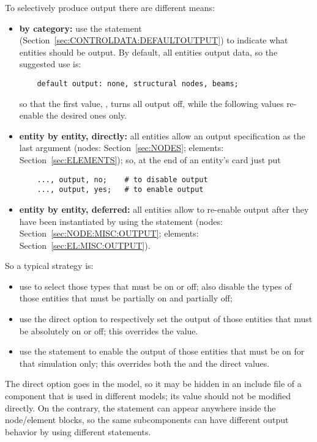 To selectively produce output there are different means:
\begin{itemize}
\item \textbf{by category:} use the  statement
(Section~\ref{sec:CONTROLDATA:DEFAULTOUTPUT}) to indicate what entities
should be output.
By default, all entities output data, so the suggested use is:
\begin{verbatim}
    default output: none, structural nodes, beams;
\end{verbatim}
so that the first value, , turns all output off, while the
following values re-enable the desired ones only.

\item \textbf{entity by entity, directly:}
all entities allow an output specification as the last argument
(nodes: Section~\ref{sec:NODES}; elements: Section~\ref{sec:ELEMENTS});
so, at the end of an entity's card just put
\begin{verbatim}
    ..., output, no;    # to disable output
    ..., output, yes;   # to enable output
\end{verbatim}

\item \textbf{entity by entity, deferred:}
all entities allow to re-enable output after they have
been instantiated by using the  statement
(nodes: Section~\ref{sec:NODE:MISC:OUTPUT};
elements: Section~\ref{sec:EL:MISC:OUTPUT}).
\end{itemize}

So a typical strategy is:
\begin{itemize}
\item use  to select those types that must be on or off;
also disable the types of those entities that must be partially 
on and partially off;
\item use the direct option to respectively set the output
of those entities that must be absolutely on or off; this overrides
the  value.
\item use the  statement to enable the output of those
entities that must be on for that simulation only; this overrides
both the  and the direct values.
\end{itemize}

The direct option goes in the model, so it may be hidden 
in an include file of a component that is used in different models;
its value should not be modified directly.
On the contrary, the  statement can appear anywhere
inside the node/element blocks, so the same subcomponents can have
different output behavior by using different  statements.

